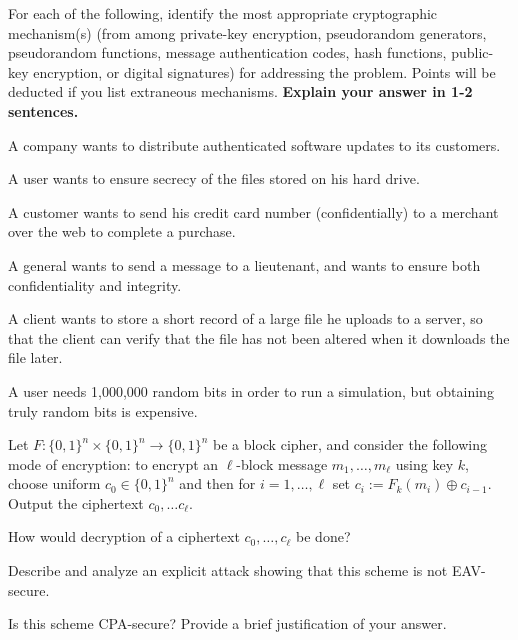 \documentclass[a4paper,10pt,landscape,twocolumn]{scrartcl}
\begin{document}
\begin{exercise}
For each of the following, identify the most appropriate cryptographic
mechanism(s) (from among private-key encryption, pseudorandom generators, pseudorandom functions, message authentication codes, hash functions, public-key encryption, or digital signatures) for addressing the problem. Points will be deducted if you
list extraneous mechanisms. \textbf{Explain your answer in 1-2 sentences.}
\begin{subex}
A company wants to distribute authenticated software updates to its customers.
\end{subex}
\begin{subex}
A user wants to ensure secrecy of the files stored on his hard drive.
\end{subex}
\begin{subex}
A customer wants to send his credit card number (confidentially) to a merchant
over the web to complete a purchase.
\end{subex}
\begin{subex}
A general wants to send a message to a lieutenant, and wants to ensure both
confidentiality and integrity.
\end{subex}
\begin{subex}
A client wants to store a short record of a large file he uploads to a server, so that
the client can verify that the file has not been altered when it downloads the file
later.
\end{subex}
\begin{subex}
A user needs 1,000,000 random bits in order to run a simulation, but obtaining
truly random bits is expensive.
\end{subex}
\end{exercise}

\begin{exercise}
Let $F : \{0, 1\}^n \times \{0, 1\}^n \rightarrow \{0, 1\}^n$ be a block cipher, and consider the
following mode of encryption: to encrypt an $\ell$-block message $m_1, \ldots , m_{\ell}$ using key $k$,
choose uniform $c_0 \in \{0, 1\}^n$ and then for $i = 1,  \ldots , \ell$ set $c_i := F_k(m_i) \oplus c_{i-1}$. Output
the ciphertext $c_0 , \ldots c_{\ell}$.
\begin{subex}
How would decryption of a ciphertext $c_0,  \ldots , c_{\ell}$ be done?
\end{subex}
\begin{subex}
Describe and analyze an explicit attack showing that this scheme is not EAV-
secure.
\end{subex}
\begin{subex}
Is this scheme CPA-secure? Provide a brief justification of your answer.
\end{subex}
\end{exercise}
\end{document}
